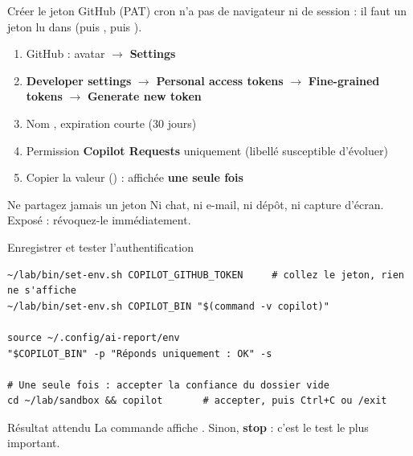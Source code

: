 \documentclass[aspectratio=169,10pt,t]{beamer}
\begin{document}
\begin{frame}[fragile]{Cr\'eer le jeton GitHub (PAT)}
cron n'a pas de navigateur ni de session : il faut un jeton lu dans  (puis , puis ).
\begin{enumerate}
\item GitHub : avatar $\rightarrow$ \textbf{Settings}
\item \textbf{Developer settings} $\rightarrow$ \textbf{Personal access tokens} $\rightarrow$ \textbf{Fine-grained tokens} $\rightarrow$ \textbf{Generate new token}
\item Nom , expiration courte (30 jours)
\item Permission \textbf{Copilot Requests} uniquement (libell\'e susceptible d'\'evoluer)
\item Copier la valeur () : affich\'ee \textbf{une seule fois}
\end{enumerate}
\begin{alertblock}{Ne partagez jamais un jeton}
Ni chat, ni e-mail, ni d\'ep\^ot, ni capture d'\'ecran. Expos\'e : r\'evoquez-le imm\'ediatement.
\end{alertblock}
\end{frame}

\begin{frame}[fragile]{Enregistrer et tester l'authentification}
\begin{lstlisting}[style=term]
~/lab/bin/set-env.sh COPILOT_GITHUB_TOKEN     # collez le jeton, rien ne s'affiche
~/lab/bin/set-env.sh COPILOT_BIN "$(command -v copilot)"

source ~/.config/ai-report/env
"$COPILOT_BIN" -p "Réponds uniquement : OK" -s

# Une seule fois : accepter la confiance du dossier vide
cd ~/lab/sandbox && copilot       # accepter, puis Ctrl+C ou /exit
\end{lstlisting}
\begin{exampleblock}{R\'esultat attendu}
La commande affiche . Sinon, \textbf{stop} : c'est le test le plus important.
\end{exampleblock}
\end{frame}
\end{document}
